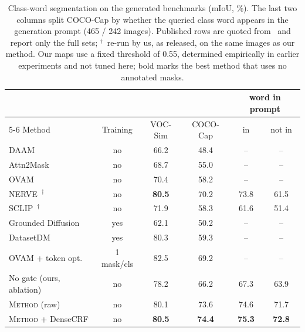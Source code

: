\documentclass[runningheads]{llncs}
\newcommand{\method}{\textsc{Method}}          %
\begin{document}
\begin{table}[t]
\centering
\caption{Class-word segmentation on the generated benchmarks (mIoU, \%). The last two columns split COCO-Cap by whether the queried class word appears in the generation prompt (465 / 242 images). Published rows are quoted from~\cite{marcosmanchon2024ovam} and report only the full sets; $^\dagger$~re-run by us, as released, on the same images as our method. Our maps use a fixed threshold of 0.55, determined empirically in earlier experiments and not tuned here; bold marks the best method that uses no annotated masks.}
\label{tab:generated}
\footnotesize\setlength{\tabcolsep}{3pt}
\begin{tabular}{@{}lccccc@{}}
\toprule
 & & & & \multicolumn{2}{c}{word in prompt} \\
\cmidrule(lr){5-6}
Method & Training & VOC-Sim & COCO-Cap & in & not in \\
\midrule
DAAM~\cite{tang2023daam}                 & no  & 66.2 & 48.4 & -- & -- \\
Attn2Mask~\cite{yoshihashi2024attn2mask} & no  & 68.7 & 55.0 & -- & -- \\
OVAM~\cite{marcosmanchon2024ovam}        & no  & 70.4 & 58.2 & -- & -- \\
NERVE~\cite{mahatha2025nerve}$^\dagger$  & no  & \textbf{80.5} & 70.2 & 73.8 & 61.5 \\
SCLIP~\cite{wang2024sclip}$^\dagger$     & no  & 71.9 & 58.3 & 61.6 & 51.4 \\
\midrule
Grounded Diffusion~\cite{li2023groundeddiffusion} & yes & 62.1 & 50.2 & -- & -- \\
DatasetDM~\cite{wu2023datasetdm}         & yes & 80.3 & 59.3 & -- & -- \\
OVAM + token opt.~\cite{marcosmanchon2024ovam} & 1 mask/cls & 82.5 & 69.2 & -- & -- \\
\midrule
No gate (ours, ablation)                 & no  & 78.2 & 66.2 & 67.3 & 63.9 \\
\method{} (raw)                          & no  & 80.1 & 73.6 & 74.6 & 71.7 \\
\method{} + DenseCRF                     & no  & \textbf{80.5} & \textbf{74.4} & \textbf{75.3} & \textbf{72.8} \\
\bottomrule
\end{tabular}
\end{table}
\end{document}
